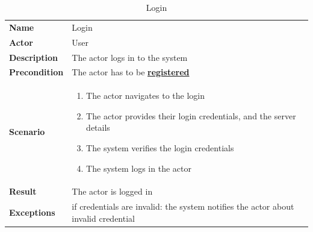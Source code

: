 \begin{table}[ht]
    \caption{Login}
    \begin{tabular}{|L{5cm}|L{10cm}|}
        \toprule
        \textbf{Name}         & Login                                                                              \\
        \textbf{Actor}        & User                                                                               \\
        \textbf{Description}  & The actor logs in to the system                                                    \\
        \textbf{Precondition} & The actor has to be \textbf{\hyperref[tab:table7]{registered}}                     \\
        \textbf{Scenario} &
        \vspace{-0.75cm}
        \begin{enumerate}
            \setlength\itemsep{-0.5em}
            \item The actor navigates to the login
            \item The actor provides their login credentials, and the server details
            \item The system verifies the login credentials
            \item The system logs in the actor
        \end{enumerate} \\[-0.5cm]
        \textbf{Result}       & The actor is logged in                                                             \\
        \textbf{Exceptions}   & if credentials are invalid: the system notifies the actor about invalid credential \\
        \bottomrule
    \end{tabular}
    \label{tab:table8}
\end{table}

